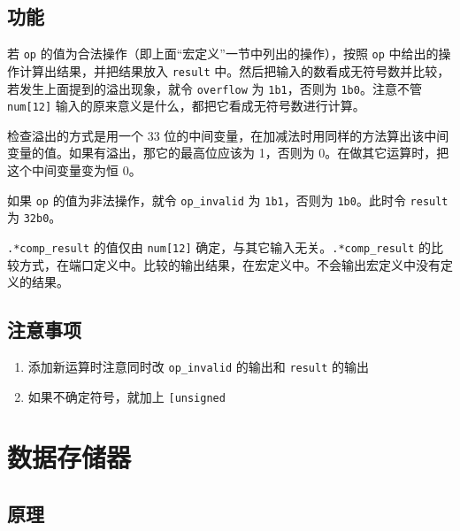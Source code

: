 \documentclass[12pt,AutoFakeBold]{article}
\providecommand{\tightlist}{%
  \setlength{\itemsep}{0pt}\setlength{\parskip}{0pt}}
\begin{document}
\hypertarget{ux529fux80fd-7}{%
\subsection{功能}\label{ux529fux80fd-7}}

若 \texttt{op} 的值为合法操作（即上面``宏定义''一节中列出的操作），按照
\texttt{op} 中给出的操作计算出结果，并把结果放入 \texttt{result}
中。然后把输入的数看成无符号数并比较，若发生上面提到的溢出现象，就令
\texttt{overflow} 为 \texttt{1\textquotesingle{}b1}，否则为
\texttt{1\textquotesingle{}b0}。注意不管 \texttt{num{[}12{]}}
输入的原来意义是什么，都把它看成无符号数进行计算。

检查溢出的方式是用一个 33
位的中间变量，在加减法时用同样的方法算出该中间变量的值。如果有溢出，那它的最高位应该为
1，否则为 0。在做其它运算时，把这个中间变量变为恒 0。

如果 \texttt{op} 的值为非法操作，就令 \texttt{op\_invalid} 为
\texttt{1\textquotesingle{}b1}，否则为
\texttt{1\textquotesingle{}b0}。此时令 \texttt{result} 为
\texttt{32\textquotesingle{}b0}。

\texttt{.*comp\_result} 的值仅由 \texttt{num{[}12{]}}
确定，与其它输入无关。\texttt{.*comp\_result}
的比较方式，在端口定义中。比较的输出结果，在宏定义中。不会输出宏定义中没有定义的结果。

\hypertarget{ux6ce8ux610fux4e8bux9879-4}{%
\subsection{注意事项}\label{ux6ce8ux610fux4e8bux9879-4}}

\begin{enumerate}
\def\labelenumi{\arabic{enumi}.}
\tightlist
\item
  添加新运算时注意同时改 \texttt{op\_invalid} 的输出和 \texttt{result}
  的输出
\item
  如果不确定符号，就加上 \texttt{{[}un\textbar{}{]}signed}
\end{enumerate}

\hypertarget{ux6570ux636eux5b58ux50a8ux5668}{%
\section{数据存储器}\label{ux6570ux636eux5b58ux50a8ux5668}}

\hypertarget{ux539fux7406-4}{%
\subsection{原理}\label{ux539fux7406-4}}
\end{document}
